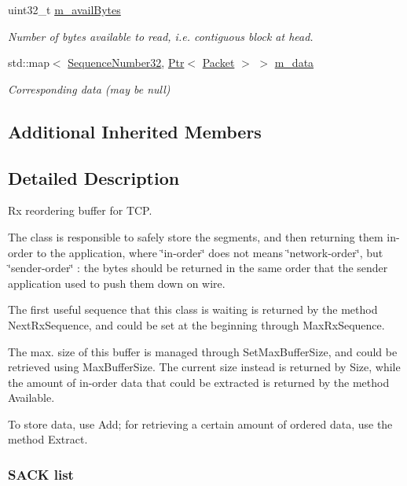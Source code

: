 \begin{DoxyCompactItemize}
uint32\+\_\+t \hyperlink{classns3_1_1TcpRxBuffer_a700ba510c9ea3ef08f11baf0de7244dc}{m\+\_\+avail\+Bytes}
\begin{DoxyCompactList}\small\item\em Number of bytes available to read, i.\+e. contiguous block at head. \end{DoxyCompactList}\item 
std\+::map$<$ \hyperlink{group__network_gacb2070e4e98d2d5135c9bede58f07a03}{Sequence\+Number32}, \hyperlink{classns3_1_1Ptr}{Ptr}$<$ \hyperlink{classns3_1_1Packet}{Packet} $>$ $>$ \hyperlink{classns3_1_1TcpRxBuffer_a695c34ebc7bd328b49c507f101257aed}{m\+\_\+data}
\begin{DoxyCompactList}\small\item\em Corresponding data (may be null) \end{DoxyCompactList}\end{DoxyCompactItemize}
\subsection*{Additional Inherited Members}


\subsection{Detailed Description}
Rx reordering buffer for T\+CP. 

The class is responsible to safely store the segments, and then returning them in-\/order to the application, where \char`\"{}in-\/order\char`\"{} does not means \char`\"{}network-\/order\char`\"{}, but \char`\"{}sender-\/order\char`\"{} \+: the bytes should be returned in the same order that the sender application used to push them down on wire.

The first useful sequence that this class is waiting is returned by the method Next\+Rx\+Sequence, and could be set at the beginning through Max\+Rx\+Sequence.

The max. size of this buffer is managed through Set\+Max\+Buffer\+Size, and could be retrieved using Max\+Buffer\+Size. The current size instead is returned by Size, while the amount of in-\/order data that could be extracted is returned by the method Available.

To store data, use Add; for retrieving a certain amount of ordered data, use the method Extract.

\subsubsection*{S\+A\+CK list }

